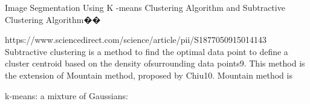 Image Segmentation Using K -means Clustering Algorithm and Subtractive Clustering Algorithm��{
https://www.sciencedirect.com/science/article/pii/S1877050915014143
Subtractive clustering is a method to find the optimal data point to define a cluster centroid based on the density ofsurrounding data points9. This method is the extension of Mountain method, proposed by Chiu10. Mountain method is

}

k-means: 
a mixture of Gaussians: 


